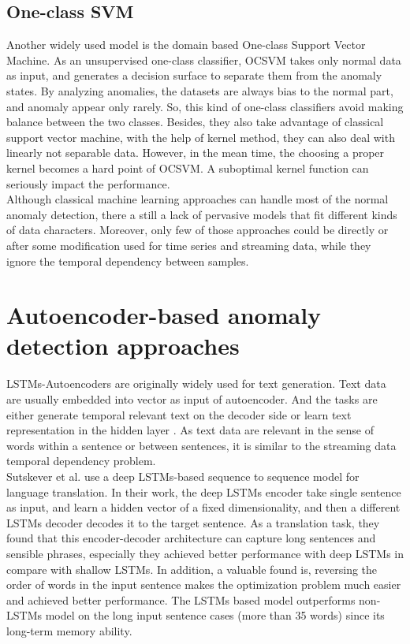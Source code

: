 \subsection{One-class SVM}
\label{ocsvm}
Another widely used model is the domain based One-class Support Vector Machine. As an unsupervised one-class classifier, OCSVM takes only normal data as input, and generates a decision surface to separate them from the anomaly states.  By analyzing anomalies, the datasets are always bias to the normal part, and anomaly appear only rarely. So, this kind of one-class classifiers avoid making balance between the two classes. Besides, they also take advantage of classical support vector machine, with the help of kernel method, they can also deal with linearly not separable data. However, in the mean time, the choosing a proper kernel becomes a hard point of OCSVM. A suboptimal kernel function can seriously impact the performance.\\
Although classical machine learning approaches can handle most of the normal anomaly detection, there a still a lack of pervasive models that fit different kinds of data characters. Moreover, only few of those approaches could be directly or after some modification used for time series and streaming data, while they ignore the temporal dependency between samples.



\section{Autoencoder-based anomaly detection approaches}
\label{sec:Autoencoder-based anomaly detection approaches}

LSTMs-Autoencoders are originally widely used for text generation. Text data are usually embedded into vector as input of autoencoder. And the tasks are either generate temporal relevant text on the decoder side or learn text representation in the hidden layer \cite{phraserepresentation}. As text data are relevant in the sense of words within a sentence or between sentences, it is similar to the streaming data temporal dependency problem.\\

Sutskever et al. \cite{seq2seq} use a deep LSTMs-based sequence to sequence model for language translation. In their work, the deep LSTMs encoder take single sentence as input, and learn a hidden vector of a fixed dimensionality, and then a different LSTMs decoder decodes it to the target sentence.  As a translation task, they found that this encoder-decoder architecture can capture long sentences and sensible phrases, especially they achieved better performance with deep LSTMs in compare with shallow LSTMs. In addition, a valuable found is, reversing the order of words in the input sentence makes the optimization problem much easier and achieved better performance. The LSTMs based model outperforms non-LSTMs model on the long input sentence cases (more than 35 words) since its long-term memory ability.\\

